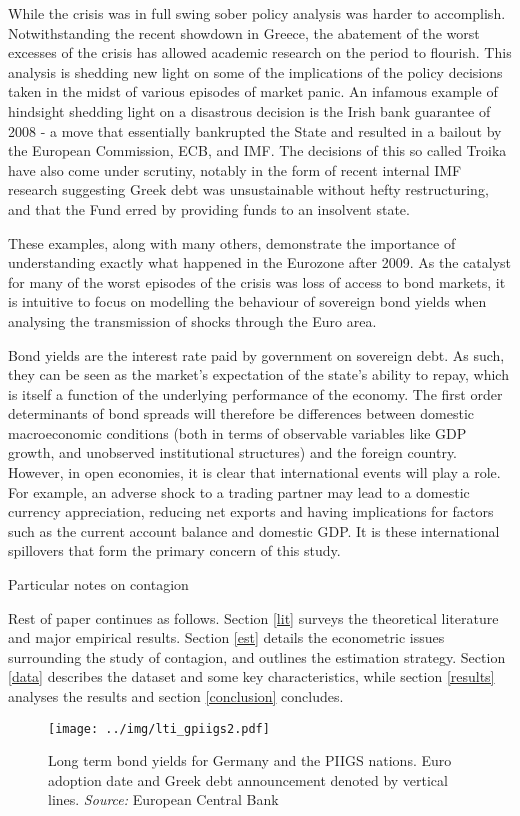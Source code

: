 \documentclass[/../base.tex]{subfiles}
\begin{document}
While the crisis was in full swing sober policy analysis was harder to accomplish. Notwithstanding the recent showdown in Greece, the abatement of the worst excesses of the crisis has allowed academic research on the period to flourish. This analysis is shedding new light on some of the implications of the policy decisions taken in the midst of various episodes of market panic. An infamous example of hindsight shedding light on a disastrous decision is the Irish bank guarantee of 2008 - a move that essentially bankrupted the State and resulted in a bailout by the European Commission, ECB, and IMF. The decisions of this so called Troika have also come under scrutiny, notably in the form of recent internal IMF research suggesting Greek debt was unsustainable without hefty restructuring, and that the Fund erred by providing funds to an insolvent state. 

These examples, along with many others, demonstrate the importance of understanding exactly what happened in the Eurozone after 2009. As the catalyst for many of the worst episodes of the crisis was loss of access to bond markets, it is intuitive to focus on modelling the behaviour of sovereign bond yields when analysing the transmission of shocks through the Euro area. 

Bond yields are the interest rate paid by government on sovereign debt. As such, they can be seen as the market's expectation of the state's ability to repay, which is itself a function of the underlying performance of the economy. The first order determinants of bond spreads will therefore be differences between domestic macroeconomic conditions (both in terms of observable variables like GDP growth, and unobserved institutional structures) and the foreign country. However, in open economies, it is clear that international events will play a role. For example, an adverse shock to a trading partner may lead to a domestic currency appreciation, reducing net exports and having implications for factors such as the current account balance and domestic GDP. It is these international spillovers that form the primary concern of this study. 

Particular notes on contagion

Rest of paper continues as follows. Section \ref{lit} surveys the theoretical literature and major empirical results. Section \ref{est} details the econometric issues surrounding the study of contagion, and outlines the estimation strategy. Section \ref{data} describes the dataset and some key characteristics, while section \ref{results} analyses the results and section \ref{conclusion} concludes.


\begin{figure}
	\centering
	\texttt{[image: ../img/lti\_gpiigs2.pdf]}
	\caption{Long term bond yields for Germany and the PIIGS nations. Euro adoption date and Greek debt announcement denoted by vertical lines. \textit{Source:} European Central Bank}
	\label{fig:lit_gpiigs}
\end{figure}
\end{document}
